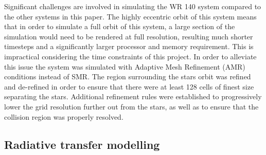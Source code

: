 
Significant challenges are involved in simulating the WR 140 system compared to the other systems in this paper. The highly eccentric orbit of this system means that in order to simulate a full orbit of this system, a large section of the simulation would need to be rendered at full resolution, resulting much shorter timesteps and a significantly larger processor and memory requirement. This is impractical considering the time constraints of this project. In order to alleviate this issue the system was simulated with Adaptive Mesh Refinement (AMR) conditions instead of SMR. The region surrounding the stars orbit was refined and de-refined in order to ensure that there were at least 128 cells of finest size separating the stars. Additional refinement rules were established to progressively lower the grid resolution further out from the stars, as well as to ensure that the collision region was properly resolved.





\subsection{Radiative transfer modelling}
